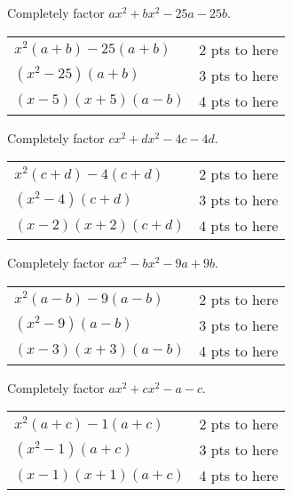 {
	Completely factor $ax^2+bx^2-25a-25b$.
}
{
	\begin{tabular}{l r}
	$x^2(a+b)-25(a+b)$ & 2 pts to here\\
	$(x^2-25)(a+b)$ & 3 pts to here\\
	$(x-5)(x+5)(a-b)$ & 4 pts to here
	\end{tabular}
}


{
	Completely factor $cx^2+dx^2-4c-4d$.
}
{
	\begin{tabular}{l r}
	$x^2(c+d)-4(c+d)$ & 2 pts to here\\
	$(x^2-4)(c+d)$ & 3 pts to here\\
	$(x-2)(x+2)(c+d)$ & 4 pts to here
	\end{tabular}
}

{
	Completely factor $ax^2-bx^2-9a+9b$.
}
{
	\begin{tabular}{l r}
	$x^2(a-b)-9(a-b)$ & 2 pts to here\\
	$(x^2-9)(a-b)$ & 3 pts to here\\
	$(x-3)(x+3)(a-b)$ & 4 pts to here
	\end{tabular}
}

{
	Completely factor $ax^2+cx^2-a-c$.
}
{
	\begin{tabular}{l r}
	$x^2(a+c)-1(a+c)$ & 2 pts to here\\
	$(x^2-1)(a+c)$ & 3 pts to here\\
	$(x-1)(x+1)(a+c)$ & 4 pts to here
	\end{tabular}
}
